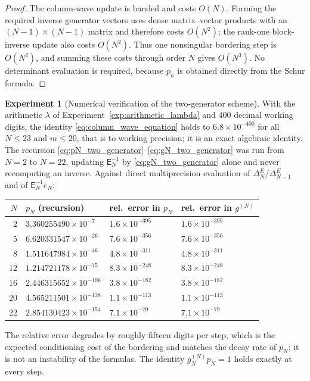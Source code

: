 \documentclass[11pt]{amsart}
\numberwithin{equation}{section}
\theoremstyle{plain}
\theoremstyle{definition}
\newtheorem{experiment}[theorem]{Experiment}
\theoremstyle{remark}
\newcommand{\E}{\mathsf E}
\begin{document}
\begin{proof}
The column-wave update is banded and costs \(O(N)\).  Forming the required inverse
generator vectors uses dense matrix--vector products with an \((N-1)\times(N-1)\)
matrix and therefore costs \(O(N^2)\); the rank-one block-inverse update also costs
\(O(N^2)\).  Thus one nonsingular bordering step is \(O(N^2)\), and summing these
costs through order \(N\) gives \(O(N^3)\).  No determinant evaluation is required,
because \(p_n\) is obtained directly from the Schur formula.
\end{proof}

\begin{experiment}[Numerical verification of the two-generator scheme]
\label{exp:two_generator}
With the arithmetic $\lambda$ of Experiment~\ref{exp:arithmetic_lambda} and $400$ decimal
working digits, the identity \eqref{eq:column_wave_equation} holds to $6.8\times10^{-400}$
for all $N\le23$ and $m\le20$, that is to working precision; it is an exact algebraic
identity.  The recursion \eqref{eq:pN_two_generator}--\eqref{eq:gN_two_generator} was run
from $N=2$ to $N=22$, updating $\E_N^{-1}$ by \eqref{eq:gN_two_generator} alone and never
recomputing an inverse.  Against direct multiprecision evaluation of
$\Delta_N^E/\Delta_{N-1}^E$ and of $\E_N^{-1}e_N$:
\begin{center}
\small
\begin{tabular}{rlll}
\toprule
$N$ & $p_N$ (recursion) & rel.\ error in $p_N$ & rel.\ error in $g^{(N)}$\\
\midrule
$2$  & $3.360255490\times10^{-7}$   & $1.6\times10^{-395}$ & $1.6\times10^{-395}$\\
$5$  & $6.620331547\times10^{-26}$  & $7.6\times10^{-356}$ & $7.6\times10^{-356}$\\
$8$  & $1.511647984\times10^{-46}$  & $4.8\times10^{-311}$ & $4.8\times10^{-311}$\\
$12$ & $1.214721178\times10^{-75}$  & $8.3\times10^{-248}$ & $8.3\times10^{-248}$\\
$16$ & $2.446315652\times10^{-106}$ & $3.8\times10^{-182}$ & $3.8\times10^{-182}$\\
$20$ & $4.565211501\times10^{-138}$ & $1.1\times10^{-113}$ & $1.1\times10^{-113}$\\
$22$ & $2.854130423\times10^{-154}$ & $7.1\times10^{-79}\phantom{0}$ & $7.1\times10^{-79}$\\
\bottomrule
\end{tabular}
\end{center}
The relative error degrades by roughly fifteen digits per step, which is the expected
conditioning cost of the bordering and matches the decay rate of $p_N$; it is not an
instability of the formulas.  The identity $g^{(N)}_Np_N=1$ holds exactly at every step.


\end{experiment}
\end{document}
